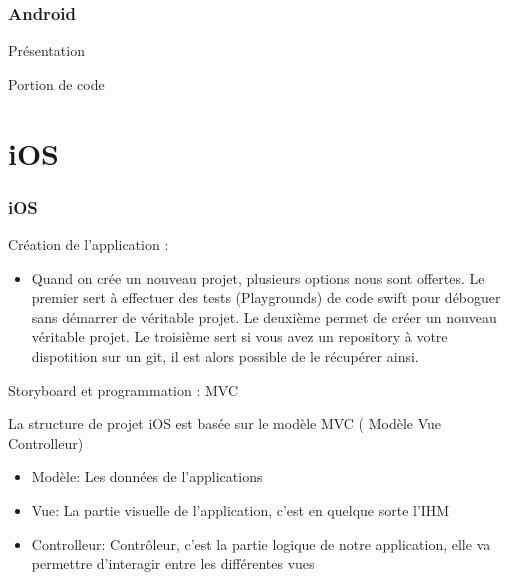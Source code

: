 \documentclass{beamer}
\begin{document}
\begin{frame}
\frametitle{Android}
\begin{block}{Présentation}
\end{block}

\end{frame}

\begin{frame}
\begin{block}{Portion de code}
\end{block}
   
\end{frame}



\section{iOS}
   
\begin{frame}
\frametitle{iOS}
 \begin{block}{Création de l'application : }
    \begin{itemize}
    \item {Quand on crée un nouveau projet, plusieurs options nous sont offertes. Le premier sert à effectuer des tests (Playgrounds) de code swift pour déboguer sans démarrer de véritable projet. Le deuxième permet de créer un nouveau véritable projet. Le troisième sert si vous avez un repository à votre dispotition sur un git, il est alors possible de le récupérer ainsi.}
    \end{itemize}
  \end{block}

	\begin{block}{Storyboard et programmation  : MVC}
	\par La structure de projet iOS est basée sur le modèle MVC ( Modèle Vue Controlleur)
	 \begin{itemize}
    	\item {Modèle: Les données de l’applications }
	\item {Vue: La partie visuelle de l’application, c’est en quelque sorte l’IHM  }
	\item {Controlleur: Contrôleur, c’est la partie logique de notre application, elle va permettre d’interagir entre les différentes vues }
 
    \end{itemize}
	\end{block}
\end{frame}
\end{document}
